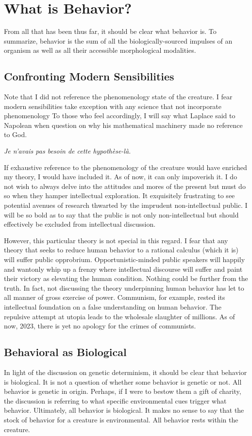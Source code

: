 \documentclass[12pt]{article}
\begin{document}
\section{What is Behavior?}
From all that has been thus far, it should be clear what behavior is.
To summarize, behavior is the sum of all the biologically-sourced impulses of an organism as well as all their accessible morphological modalities.

\subsection{Confronting Modern Sensibilities}
Note that I did not reference the phenomenology state of the creature.
I fear modern sensibilities take exception with any science that not incorporate phenomenology
To those who feel accordingly, I will say what Laplace said to Napolean when question on why his mathematical machinery made no reference to God.

\textit{Je n’avais pas besoin de cette hypothèse-là.}

If exhaustive reference to the phenomenology of the creature would have enriched my theory, I would have included it.
As of now, it can only impoverish it.
I do not wish to always delve into the attitudes and mores of the present but must do so when they hamper intellectual exploration.
It exquisitely frustrating to see potential avenues of research thwarted by the imprudent non-intellectual public.
I will be so bold as to say that the public is not only non-intellectual but should effectively be excluded from intellectual discussion.

However, this particular theory is not special in this regard.
I fear that any theory that seeks to reduce human behavior to a rational calculus (which it is) will suffer public opprobrium.
Opportunistic-minded public speakers will happily and wantonly whip up a frenzy where intellectual discourse will suffer and paint their victory as elevating the human condition.
Nothing could be further from the truth.
In fact, not discussing the theory underpinning human behavior has let to all manner of gross exercise of power.
Communism, for example, rested its intellectual foundation on a false understanding on human behavior.
The repulsive attempt at utopia leads to the wholesale slaughter of millions.
As of now, 2023, there is yet no apology for the crimes of communists.

\subsection{Behavioral as Biological}
In light of the discussion on genetic determinism, it should be clear that behavior is biological.
It is not a question of whether some behavior is genetic or not.
All behavior is genetic in origin.
Perhaps, if I were to bestow them a gift of charity, the discussion is referring to what specific environmental cues trigger what behavior.
Ultimately, all behavior is biological.
It makes no sense to say that the stock of behavior for a creature is environmental.
All behavior rests within the creature.
\end{document}
